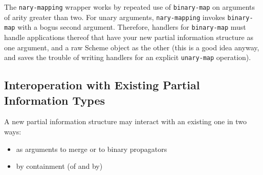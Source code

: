 \documentclass[12pt,letterpaper,english]{article}
\begin{document}
The \texttt{nary-mapping} wrapper works by repeated use of \texttt{binary-map}
on arguments of arity greater than two.  For unary arguments,
\texttt{nary-mapping} invokes \texttt{binary-map} with a bogus second argument.
Therefore, handlers for \texttt{binary-map} must handle
applications thereof that have your new partial information structure
as one argument, and a raw Scheme object as the other (this is a good
idea anyway, and saves the trouble of writing handlers for an explicit
\texttt{unary-map} operation).



\subsection{Interoperation with Existing Partial Information Types}
\label{interoperation-with-existing-partial-information-types}

A new partial information structure may interact with an existing one
in two ways:
\begin{itemize}
\item {} 
as arguments to merge or to binary propagators

\item {} 
by containment (of and by)

\end{itemize}
\end{document}
